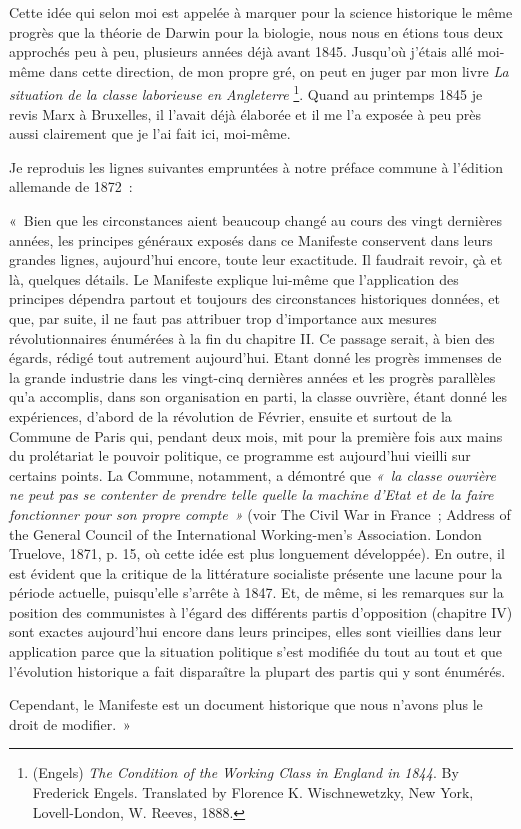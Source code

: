 \documentclass[french,twoside]{book} %
\newenvironment{quoteblock}%
  {\begin{quoting}}
  {\end{quoting}}
\newenvironment{quotebar}{%
    \def\FrameCommand{{\color{rubric!10!}\vrule width 0.5em} \hspace{0.9em}}%
    \def\OuterFrameSep{0pt} %
    \MakeFramed {\advance\hsize-\width \FrameRestore}
  }%
  {%
    \endMakeFramed
  }
\renewenvironment{quoteblock}%
  {%
    \savenotes
    \setstretch{0.9}
    \begin{quotebar}
    \smallskip
  }
  {%
    \smallskip
    \end{quotebar}
    \spewnotes
  }
\begin{document}
Cette idée qui selon moi est appelée à marquer pour la science historique le même progrès que la théorie de Darwin pour la biologie, nous nous en étions tous deux approchés peu à peu, plusieurs années déjà avant 1845. Jusqu’où j’étais allé moi-même dans cette direction, de mon propre gré, on peut en juger par mon livre \emph{La situation de la classe laborieuse en Angleterre} \footnote{(Engels) \emph{The Condition of the Working Class in England in 1844}. By Frederick Engels. Translated by Florence K. Wischnewetzky, New York, Lovell-London, W. Reeves, 1888.}. Quand au printemps 1845 je revis Marx à Bruxelles, il l’avait déjà élaborée et il me l’a exposée à peu près aussi clairement que je l’ai fait ici, moi-même.\par
Je reproduis les lignes suivantes empruntées à notre préface commune à l’édition allemande de 1872 :\par

\begin{quoteblock}
 \noindent « Bien que les circonstances aient beaucoup changé au cours des vingt dernières années, les principes généraux exposés dans ce Manifeste conservent dans leurs grandes lignes, aujourd’hui encore, toute leur exactitude. Il faudrait revoir, çà et là, quelques détails. Le Manifeste explique lui-même que l’application des principes dépendra partout et toujours des circonstances historiques données, et que, par suite, il ne faut pas attribuer trop d’importance aux mesures révolutionnaires énumérées à la fin du chapitre II. Ce passage serait, à bien des égards, rédigé tout autrement aujourd’hui. Etant donné les progrès immenses de la grande industrie dans les vingt-cinq dernières années et les progrès parallèles qu’a accomplis, dans son organisation en parti, la classe ouvrière, étant donné les expériences, d’abord de la révolution de Février, ensuite et surtout de la Commune de Paris qui, pendant deux mois, mit pour la première fois aux mains du prolétariat le pouvoir politique, ce programme est aujourd’hui vieilli sur certains points. La Commune, notamment, a démontré que \emph{« la classe ouvrière ne peut pas se contenter de prendre telle quelle la machine d’Etat et de la faire fonctionner pour son propre compte »} (voir The Civil War in France ; Address of the General Council of the International Working-men’s Association. London Truelove, 1871, p. 15, où cette idée est plus longuement développée). En outre, il est évident que la critique de la littérature socialiste présente une lacune pour la période actuelle, puisqu’elle s’arrête à 1847. Et, de même, si les remarques sur la position des communistes à l’égard des différents partis d’opposition (chapitre IV) sont exactes aujourd’hui encore dans leurs principes, elles sont vieillies dans leur application parce que la situation politique s’est modifiée du tout au tout et que l’évolution historique a fait disparaître la plupart des partis qui y sont énumérés.\par
 Cependant, le Manifeste est un document historique que nous n’avons plus le droit de modifier. »
 \end{quoteblock}
\end{document}
